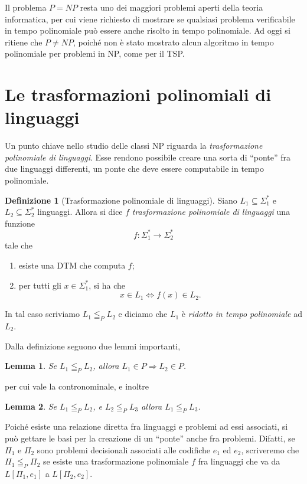 \documentclass[10pt]{\classname}
\theoremstyle{newlinethm}
\theoremstyle{theorem}
\newtheorem{lemma}{Lemma}[section]
\theoremstyle{definition}
\newtheorem{definizione}{Definizione}[section]
\theoremstyle{definition}
\theoremstyle{definition}
\theoremstyle{definition}
\begin{document}
Il problema $P = NP$ resta uno dei maggiori problemi aperti della teoria informatica, per cui viene richiesto di mostrare se qualsiasi problema verificabile in tempo polinomiale può essere anche risolto in tempo polinomiale. Ad oggi si ritiene che $P \neq NP$, poiché non è stato mostrato alcun algoritmo in tempo polinomiale per problemi in NP, come per il TSP.

\section{Le trasformazioni polinomiali di linguaggi}

Un punto chiave nello studio delle classi NP riguarda la \emph{trasformazione polinomiale di linguaggi}. Esse rendono possibile creare una sorta di ``ponte'' fra due linguaggi differenti, un ponte che deve essere computabile in tempo polinomiale.

\begin{definizione}[Trasformazione polinomiale di linguaggi]
    Siano $L_1 \subseteq \Sigma_1^*$ e $L_2 \subseteq \Sigma_2^*$ linguaggi. Allora si dice $f$ \emph{trasformazione polinomiale di linguaggi} una funzione \[f:\Sigma_1^* \rightarrow \Sigma_2^*\] tale che 
\begin{enumerate}
    \item esiste una DTM che computa $f$;
    \item per tutti gli $x \in \Sigma_1^*$, si ha che \[x \in L_1 \Leftrightarrow f(x) \in L_2.\]
\end{enumerate}
In tal caso scriviamo $L_1 \leqq_P L_2$ e diciamo che $L_1$ è \emph{ridotto in tempo polinomiale} ad $L_2$.
\end{definizione}
Dalla definizione seguono due lemmi importanti,
\begin{lemma}
    Se $L_1 \leqq_P L_2$, allora $L_1 \in P \Rightarrow L_2 \in P$.
\end{lemma}
per cui vale la contronominale, e inoltre
\begin{lemma}
    Se $L_1 \leqq_P L_2$, e $L_2 \leqq_P L_3$ allora $L_1 \leqq_P L_3$.
\end{lemma}

Poiché esiste una relazione diretta fra linguaggi e problemi ad essi associati, si può gettare le basi per la creazione di un ``ponte'' anche fra problemi.
Difatti, se $\Pi_1$ e $\Pi_2$ sono problemi decisionali associati alle codifiche $e_1$ ed $e_2$, scriveremo che $\Pi_1 \leqq_P \Pi_2$ se esiste una trasformazione polinomiale $f$ fra linguaggi che va da $L[\Pi_1, e_1]$ a $L[\Pi_2, e_2]$.
\end{document}
